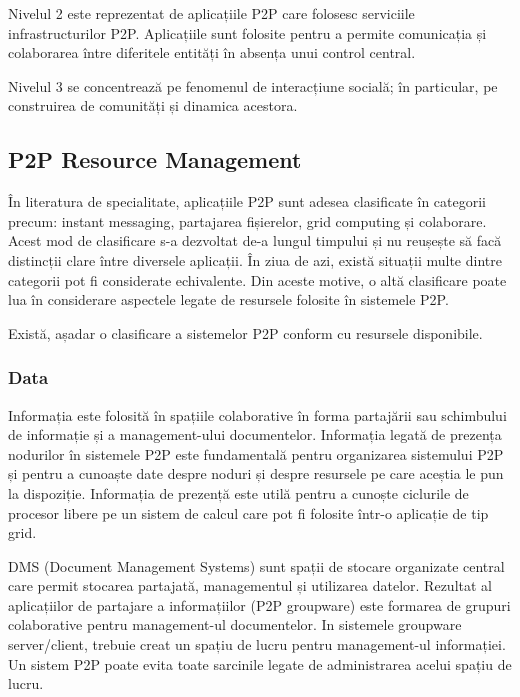 Nivelul 2 este reprezentat de aplicațiile P2P care folosesc serviciile
infrastructurilor P2P. Aplicațiile sunt folosite pentru a permite comunicația
și colaborarea între diferitele entități în absența unui control central.

Nivelul 3 se concentrează pe fenomenul de interacțiune socială; în particular,
pe construirea de comunități și dinamica acestora.

\subsection{P2P Resource Management}

În literatura de specialitate, aplicațiile P2P sunt adesea clasificate în
categorii precum: instant messaging, partajarea fișierelor, grid computing și
colaborare. Acest mod de clasificare s-a dezvoltat de-a lungul timpului și nu
reușește să facă distincții clare între diversele aplicații. În ziua de azi,
există situații multe dintre categorii pot fi considerate echivalente. Din
aceste motive, o altă clasificare poate lua în considerare aspectele legate de
resursele folosite în sistemele P2P.

Există, așadar o clasificare a sistemelor P2P conform cu resursele
disponibile.

\subsubsection{Data}

Informația este folosită în spațiile colaborative în forma partajării sau
schimbului de informație și a management-ului documentelor. Informația legată
de prezența nodurilor în sistemele P2P este fundamentală pentru organizarea
sistemului P2P și pentru a cunoaște date despre noduri și despre resursele pe
care aceștia le pun la dispoziție. Informația de prezență este utilă pentru a
cunoște ciclurile de procesor libere pe un sistem de calcul care pot fi
folosite într-o aplicație de tip grid.

DMS (Document Management Systems) sunt spații de stocare organizate central
care permit stocarea partajată, managementul și utilizarea datelor. Rezultat
al aplicațiilor de partajare a informațiilor (P2P groupware) este formarea de
grupuri colaborative pentru management-ul documentelor. In sistemele groupware
server/client, trebuie creat un spațiu de lucru pentru management-ul
informației. Un sistem P2P poate evita toate sarcinile legate de administrarea
acelui spațiu de lucru.

